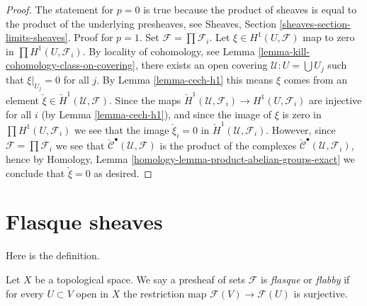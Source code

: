 \begin{proof}
The statement for $p = 0$ is true because the product of sheaves
is equal to the product of the underlying presheaves, see
Sheaves, Section \ref{sheaves-section-limits-sheaves}.
Proof for $p = 1$. Set $\mathcal{F} = \prod \mathcal{F}_i$.
Let $\xi \in H^1(U, \mathcal{F})$ map to zero in
$\prod H^1(U, \mathcal{F}_i)$. By locality of cohomology, see
Lemma \ref{lemma-kill-cohomology-class-on-covering},
there exists an open covering $\mathcal{U} : U = \bigcup U_j$ such that
$\xi|_{U_j} = 0$ for all $j$. By Lemma \ref{lemma-cech-h1} this means
$\xi$ comes from an element
$\check \xi \in \check H^1(\mathcal{U}, \mathcal{F})$.
Since the maps
$\check H^1(\mathcal{U}, \mathcal{F}_i) \to H^1(U, \mathcal{F}_i)$
are injective for all $i$ (by Lemma \ref{lemma-cech-h1}), and since
the image of $\xi$ is zero in $\prod H^1(U, \mathcal{F}_i)$ we see
that the image
$\check \xi_i = 0$ in $\check H^1(\mathcal{U}, \mathcal{F}_i)$.
However, since $\mathcal{F} = \prod \mathcal{F}_i$ we see that
$\check{\mathcal{C}}^\bullet(\mathcal{U}, \mathcal{F})$ is the
product of the complexes
$\check{\mathcal{C}}^\bullet(\mathcal{U}, \mathcal{F}_i)$,
hence by
Homology, Lemma \ref{homology-lemma-product-abelian-groups-exact}
we conclude that $\check \xi = 0$ as desired.
\end{proof}







\section{Flasque sheaves}
\label{section-flasque}

\noindent
Here is the definition.

\begin{definition}
\label{definition-flasque}
Let $X$ be a topological space. We say a presheaf of sets
$\mathcal{F}$ is {\it flasque} or {\it flabby} if for every
$U \subset V$ open in $X$ the restriction map
$\mathcal{F}(V) \to \mathcal{F}(U)$ is surjective.
\end{definition}

